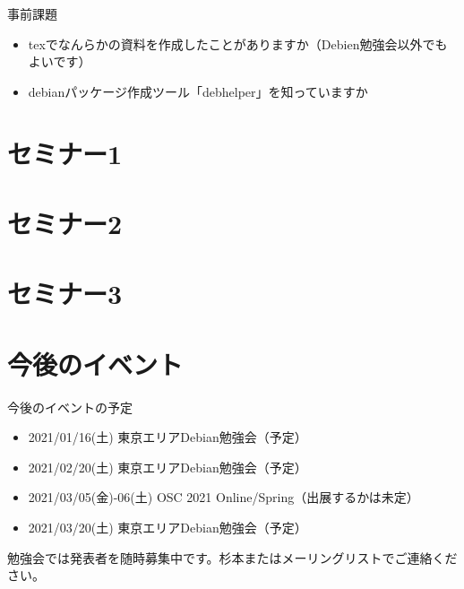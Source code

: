 
\begin{frame}{事前課題}
  \begin{itemize}
  \item texでなんらかの資料を作成したことがありますか（Debien勉強会以外でもよいです）
  \item debianパッケージ作成ツール「debhelper」を知っていますか
  \end{itemize}
\end{frame}

{\footnotesize
 
}

%

\section{セミナー1}

\section{セミナー2}

\section{セミナー3}



\section{今後のイベント}

\begin{frame}{今後のイベントの予定}
  \begin{itemize}
  \item 2021/01/16(土) 東京エリアDebian勉強会（予定）
  \item 2021/02/20(土) 東京エリアDebian勉強会（予定）
  \item 2021/03/05(金)-06(土) OSC 2021 Online/Spring（出展するかは未定）
  \item 2021/03/20(土) 東京エリアDebian勉強会（予定）
  \end{itemize}
  
勉強会では発表者を随時募集中です。杉本またはメーリングリストでご連絡ください。
\end{frame}



